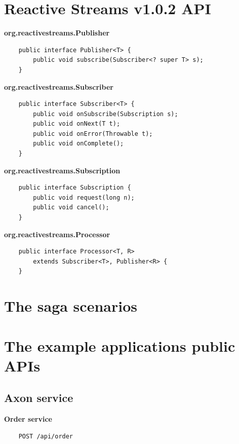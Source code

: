 \documentclass[oneside,
  digital, %
  table,   %
  nolof,     %
  nolot,     %
]{fithesis3}
\begin{document}
\chapter{Reactive Streams v1.0.2 API}
\label{reactive_streams}

\noindent
\textbf{org.reactivestreams.Publisher}

\begin{verbatim}
    public interface Publisher<T> {
        public void subscribe(Subscriber<? super T> s);
    }
\end{verbatim}

\noindent
\textbf{org.reactivestreams.Subscriber}

\begin{verbatim}
    public interface Subscriber<T> {
        public void onSubscribe(Subscription s);
        public void onNext(T t);
        public void onError(Throwable t);
        public void onComplete();
    }
\end{verbatim}

\noindent
\textbf{org.reactivestreams.Subscription}

\begin{verbatim}
    public interface Subscription {
        public void request(long n);
        public void cancel();
    }
\end{verbatim}

\noindent
\textbf{org.reactivestreams.Processor}

\begin{verbatim}
    public interface Processor<T, R> 
        extends Subscriber<T>, Publisher<R> {
    }
\end{verbatim}


\chapter{The saga scenarios}
\label{sec:appendix-scenarios}

\chapter{The example applications public APIs}
\label{sec:appendixAPI}

\section{Axon service}

\textbf{Order service}

\begin{verbatim}
    POST /api/order
\end{verbatim}
\end{document}
